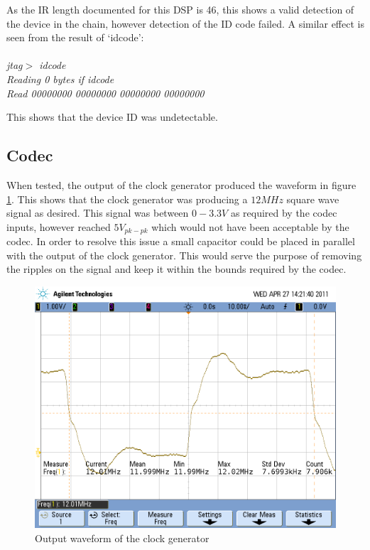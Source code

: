 \noindent As the IR length documented for this DSP is 46, this shows a valid detection of the device in the chain, however detection of the ID code failed.
A similar effect is seen from the result of `idcode':
\\
\\
\emph{
\indent jtag$>$ idcode	\\
\indent Reading 0 bytes if idcode	\\
\indent Read 00000000 00000000 00000000 00000000	\\
}

\noindent This shows that the device ID was undetectable.
\subsection{Codec}
When tested, the output of the clock generator produced the waveform in figure \ref{fig:codec12Mclk}.
This shows that the clock generator was producing a $12MHz$ square wave signal as desired.
This signal was between $0-3.3V$ as required by the codec inputs, however reached $5V_{pk-pk}$ which would not have been acceptable by the codec.
In order to resolve this issue a small capacitor could be placed in parallel with the output of the clock generator.
This would serve the purpose of removing the ripples on the signal and keep it within the bounds required by the codec.

\begin{figure}[H]
	\centering
	\includegraphics[width=\textwidth]{./img/codec_12M_clk.png}
	\caption{Output waveform of the clock generator}
	\label{fig:codec12Mclk}
\end{figure}

